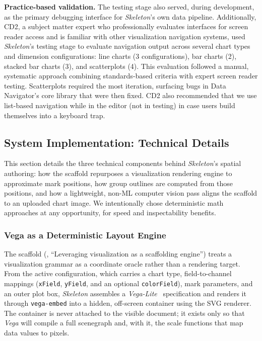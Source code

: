 \documentclass[12pt]{cmuthesis}
\begin{document}
\textbf{Practice-based validation.} The testing stage also served, during development, as the primary debugging interface for \textit{Skeleton}'s own data pipeline. Additionally, CD2, a subject matter expert who professionally evaluates interfaces for screen reader access and is familiar with other visualization navigation systems, used \textit{Skeleton}'s testing stage to evaluate navigation output across several chart types and dimension configurations: line charts (3 configurations), bar charts (2), stacked bar charts (3), and scatterplots (4). This evaluation followed a manual, systematic approach combining standards-based criteria with expert screen reader testing. Scatterplots required the most iteration, surfacing bugs in Data Navigator's core library that were then fixed. CD2 also recommended that we use list-based navigation while in the editor (not in testing) in case users build themselves into a keyboard trap.

\subsection{System Implementation: Technical Details}
\label{app:scaffold}

This section details the three technical components behind \textit{Skeleton}'s spatial authoring: how the scaffold repurposes a visualization rendering engine to approximate mark positions, how group outlines are computed from those positions, and how a lightweight, non-ML computer vision pass aligns the scaffold to an uploaded chart image. We intentionally chose deterministic math approaches at any opportunity, for speed and inspectability benefits.

\subsubsection{Vega as a Deterministic Layout Engine}

The scaffold (, ``Leveraging visualization as a scaffolding engine'') treats a visualization grammar as a coordinate oracle rather than a rendering target. From the active configuration, which carries a chart type, field-to-channel mappings (\texttt{xField}, \texttt{yField}, and an optional \texttt{colorField}), mark parameters, and an outer plot box, \textit{Skeleton} assembles a \textit{Vega-Lite}~\cite{Satyanarayan2017VegaLite} specification and renders it through \texttt{vega-embed} into a hidden, off-screen container using the SVG renderer. The container is never attached to the visible document; it exists only so that \textit{Vega} will compile a full scenegraph and, with it, the scale functions that map data values to pixels.
\end{document}
